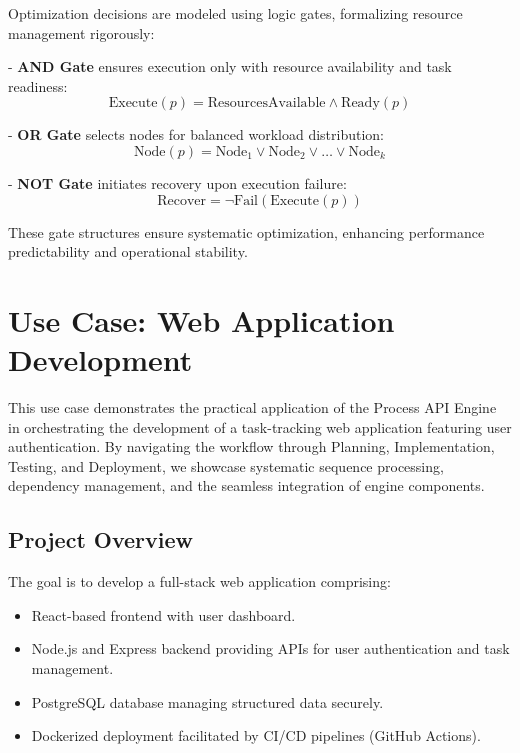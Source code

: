 \documentclass[11pt,a4paper]{article}
\begin{document}
Optimization decisions are modeled using logic gates, formalizing resource management rigorously:

- \textbf{AND Gate} ensures execution only with resource availability and task readiness:
\[
\text{Execute}(p)=\text{ResourcesAvailable}\land\text{Ready}(p)
\]

- \textbf{OR Gate} selects nodes for balanced workload distribution:
\[
\text{Node}(p)=\text{Node}_1\lor\text{Node}_2\lor\dots\lor\text{Node}_k
\]

- \textbf{NOT Gate} initiates recovery upon execution failure:
\[
\text{Recover}=\neg\text{Fail}(\text{Execute}(p))
\]

These gate structures ensure systematic optimization, enhancing performance predictability and operational stability.

\section{Use Case: Web Application Development}
\label{sec:usecases}

This use case demonstrates the practical application of the Process API Engine in orchestrating the development of a task-tracking web application featuring user authentication. By navigating the workflow through Planning, Implementation, Testing, and Deployment, we showcase systematic sequence processing, dependency management, and the seamless integration of engine components.

\subsection{Project Overview}
\label{subsec:project_overview}

The goal is to develop a full-stack web application comprising:

\begin{itemize}
    \item React-based frontend with user dashboard.
    \item Node.js and Express backend providing APIs for user authentication and task management.
    \item PostgreSQL database managing structured data securely.
    \item Dockerized deployment facilitated by CI/CD pipelines (GitHub Actions).
\end{itemize}
\end{document}

